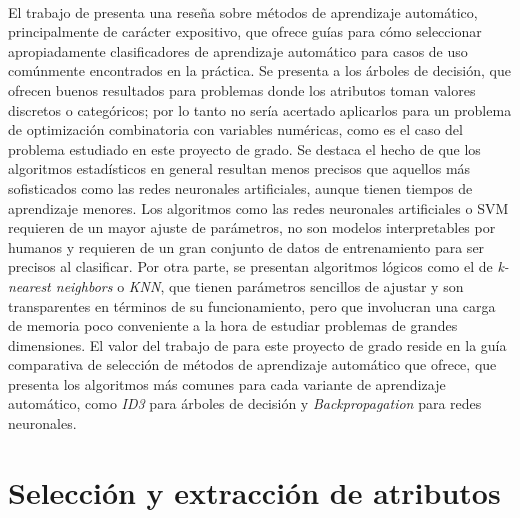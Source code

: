 \paragraph{}El trabajo de \citet{ml-survey} presenta una reseña sobre métodos de aprendizaje automático, principalmente de carácter expositivo, que ofrece guías para cómo seleccionar apropiadamente clasificadores de aprendizaje automático para casos de uso comúnmente encontrados en la práctica.
Se presenta a los árboles de decisión, que ofrecen buenos resultados para problemas donde los atributos toman valores discretos o categóricos; por lo tanto no sería acertado aplicarlos para un problema de optimización combinatoria con variables numéricas, como es el caso del problema estudiado en este proyecto de grado.
Se destaca el hecho de que los algoritmos estadísticos en general resultan menos precisos que aquellos más sofisticados como las redes neuronales artificiales, aunque tienen tiempos de aprendizaje menores.
Los algoritmos como las redes neuronales artificiales o SVM requieren de un mayor ajuste de parámetros, no son modelos interpretables por humanos y requieren de un gran conjunto de datos de entrenamiento para ser precisos al clasificar.
Por otra parte, se presentan algoritmos lógicos como el de \textit{k-nearest neighbors} o \textit{KNN}, que tienen parámetros sencillos de ajustar y son transparentes en términos de su funcionamiento, pero que involucran una carga de memoria poco conveniente a la hora de estudiar problemas de grandes dimensiones.
El valor del trabajo de \citet{ml-survey} para este proyecto de grado reside en la guía comparativa de selección de métodos de aprendizaje automático que ofrece, que presenta los algoritmos más comunes para cada variante de aprendizaje automático, como \textit{ID3} para árboles de decisión y \textit{Backpropagation} para redes neuronales.


\section{Selección y extracción de atributos} \label{section-trabajos-seleccion-extraccion-atributos}

